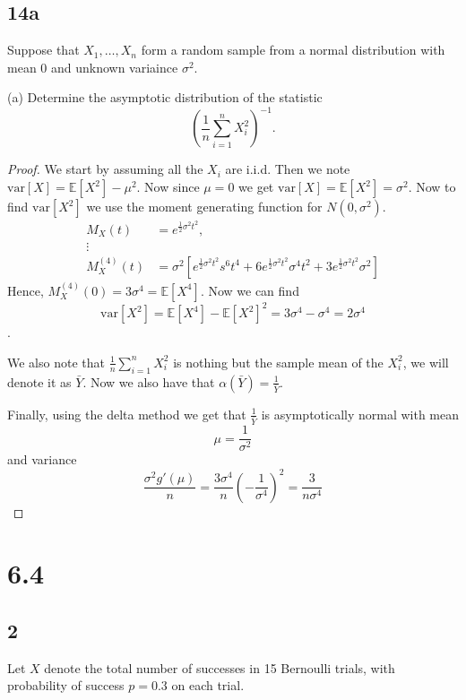 \documentclass{article}
\newcommand{\E}[1]{\mathbb{E}\left[#1\right]}
\newcommand{\var}[1]{\text{var}\left[#1\right]}
\newcommand{\randsamp}{X_1,\dots,X_n}
\newcommand{\mgf}{moment generating function }
\begin{document}
\subsection*{14a}
Suppose that $\randsamp$ form a random sample from a normal distribution with mean 0 and
unknown variaince $\sigma^2$.

(a) Determine the asymptotic distribution of the statistic
\begin{equation*}
    \left(\frac{1}{n}\sum_{i=1}^nX_i^2\right)^{-1}.
\end{equation*}

\begin{proof}
    We start by assuming all the $X_i$ are i.i.d. Then we note $\var{X} = \E{X^2} - \mu^2$.
    Now since $\mu = 0$ we get $\var{X} = \E{X^2} = \sigma^2$. Now to find $\var{X^2}$ we
    use the \mgf for $N(0, \sigma^2)$.
    \begin{align*}
        M_X(t)       & = e^{\frac{1}{2}\sigma^2t^2},                                                                                                         \\
        \vdots                                                                                                                                               \\
        M_X^{(4)}(t) & = \sigma^2\left[e^{\frac{1}{2}\sigma^2t^2}s^6t^4 + 6e^{\frac{1}{2}\sigma^2t^2}\sigma^4t^2 +3e^{\frac{1}{2}\sigma^2t^2}\sigma^2\right]
    \end{align*}
    Hence, $M_X^{(4)}(0) = 3\sigma^4 = \E{X^4}$.
    Now we can find \[\var{X^2} = \E{X^4} - \E{X^2}^2 = 3\sigma^4 - \sigma^4 = 2\sigma^4\].

    We also note that $\frac{1}{n}\sum_{i=1}^n X_i^2$ is nothing but the sample mean of the
    $X_i^2$, we will denote it as $\bar{Y}$. Now we also have that
    $\alpha(\bar{Y}) = \frac{1}{\bar{Y}}$.

    Finally, using the delta method we get that $\frac{1}{\bar{Y}}$ is asymptotically
    normal with mean \[\mu = \frac{1}{\sigma^2}\] and variance
    \[\frac{\sigma^2g'(\mu)}{n} = \frac{3\sigma^4}{n}\left(-\frac{1}{\sigma^4}\right)^2
        = \frac{3}{n\sigma^4}\]
\end{proof}

\section*{6.4}
\subsection*{2}
Let $X$ denote the total number of successes in 15 Bernoulli trials, with probability of
success $p = 0.3$ on each trial.
\end{document}
